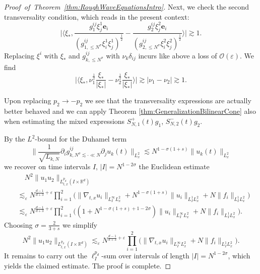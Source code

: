 \documentclass{amsart}
\theoremstyle{definition}
\newcommand{\R}{\mathbb{R}}
\begin{document}
\begin{proof}[Proof~of~Theorem~\ref{thm:RoughWaveEquationsIntro}]
Next, we check the second transversality condition, which reads in the present context:
\begin{equation*}
\big| \langle \xi_*, \frac{g^{ij}_1 \xi^1_j \mathbf{e}_i}{(g^{ij}_{1,\leq N^{\sigma}} \xi^1_i \xi^1_j)^{\frac{1}{2}}} - \frac{g^{ij}_2 \xi^2_j \mathbf{e}_i}{(g^{ij}_{2,\leq N^{\sigma}} \xi^2_i \xi^2_j)^{\frac{1}{2}}} \rangle \big| \gtrsim 1.
\end{equation*}
Replacing $\xi^i$ with $\xi_*$ and $g^{ij}_{k, \leq N^{\sigma}}$ with $\nu_k \delta_{ij}$ incurs like above a loss of $\mathcal{O}(\varepsilon)$. We find
\begin{equation*}
\big| \langle \xi_*, \nu_1^{\frac{1}{2}}  \frac{\xi_*}{|\xi_*|} - \nu_2^{\frac{1}{2}} \frac{\xi_*}{|\xi_*|} \rangle \big| \gtrsim | \nu_1 - \nu_2 | \gtrsim 1.
\end{equation*}

Upon replacing $p_2 \to - p_2$ we see that the transversality expressions are actually better behaved and we can apply Theorem \ref{thm:GeneralizationBilinearCone} also when estimating the mixed expressions $S^+_{N,1}(t) g_1$, $S^-_{N,2}(t) g_2$.

By the $L^2$-bound for the Duhamel term
\begin{equation*}
    \big\| \frac{1}{\sqrt{L_{k,N}}} \partial_i g^{ij}_{k, N^{\sigma} \lesssim \cdot \ll N} \partial_j u_k(t) \big\|_{L^2_x} \lesssim N^{1-\sigma(1+s)} \| u_k(t) \|_{L^2_x}
\end{equation*}
we recover on time intervals $I$, $|I|=N^{1-2\sigma}$ the Euclidean estimate
\begin{equation*}
\begin{split}
    &\quad N^2 \| u_1 u_2 \|_{L^{p_d}_{t,x}(I \times \R^d)} \\
    &\lesssim_\varepsilon N^{\frac{d-1}{d+3}+\varepsilon} \prod_{i=1}^2 \big( \| \nabla_{t,x} u_i \|_{L^\infty_I L^2_x} + N^{1- \sigma(1+s)} \| u_i \|_{L_I^1 L_x^2} + N \| f_i \|_{L_I^1 L_x^2} \big) \\
    &\lesssim_\varepsilon N^{\frac{d-1}{d+3}+\varepsilon} \prod_{i=1}^2 \big( (1+ N^{1- \sigma(1+s) + 1 - 2\sigma} ) \| u_i \|_{L^{\infty}_I L_x^2} + N \| f_i \|_{L_I^1 L_x^2} \big).
    \end{split}
\end{equation*}
Choosing $\sigma = \frac{2}{3+s}$ we simplify
\begin{equation*}
    N^2 \| u_1 u_2 \|_{L^{p_d}_{t,x}(I \times \R^d)} \lesssim_\varepsilon N^{\frac{d-1}{d+3}+\varepsilon} \prod_{i=1}^2 \big( \| \nabla_{t,x} u_i \|_{L^\infty_I L^2_x} + N \| f_i \|_{L_I^1 L_x^2} \big).
\end{equation*}
It remains to carry out the $\ell^{p_d}_I$-sum over intervals of length $|I| = N^{1-2 \sigma}$, which yields the claimed estimate. The proof is complete.
\end{proof}
\end{document}
